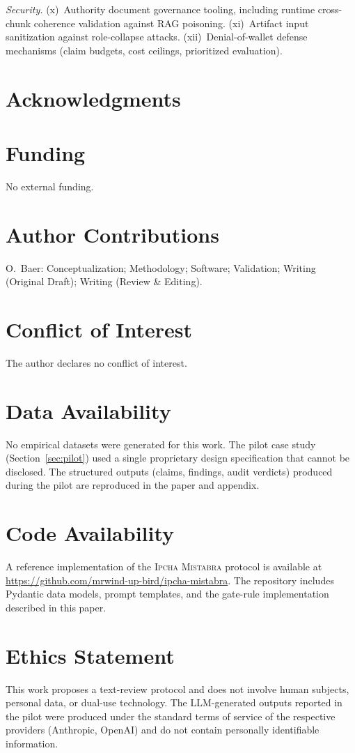\documentclass[11pt,a4paper]{article}
\newcommand{\methodname}{\textsc{Ipcha Mistabra}}
\begin{document}
\emph{Security.}
(x)~Authority document governance tooling, including runtime cross-chunk coherence validation against RAG poisoning.
(xi)~Artifact input sanitization against role-collapse attacks.
(xii)~Denial-of-wallet defense mechanisms (claim budgets, cost ceilings, prioritized evaluation).

\section*{Acknowledgments}

\section*{Funding}
No external funding.

\section*{Author Contributions}
O.~Baer: Conceptualization; Methodology; Software; Validation; Writing (Original Draft); Writing (Review \& Editing).

\section*{Conflict of Interest}
The author declares no conflict of interest.

\section*{Data Availability}
No empirical datasets were generated for this work.
The pilot case study (Section~\ref{sec:pilot}) used a single proprietary design specification that cannot be disclosed.
The structured outputs (claims, findings, audit verdicts) produced during the pilot are reproduced in the paper and appendix.

\section*{Code Availability}
A reference implementation of the \methodname{} protocol is available at \url{https://github.com/mrwind-up-bird/ipcha-mistabra}.
The repository includes Pydantic data models, prompt templates, and the gate-rule implementation described in this paper.

\section*{Ethics Statement}
This work proposes a text-review protocol and does not involve human subjects, personal data, or dual-use technology.
The LLM-generated outputs reported in the pilot were produced under the standard terms of service of the respective providers (Anthropic, OpenAI) and do not contain personally identifiable information.
\end{document}
